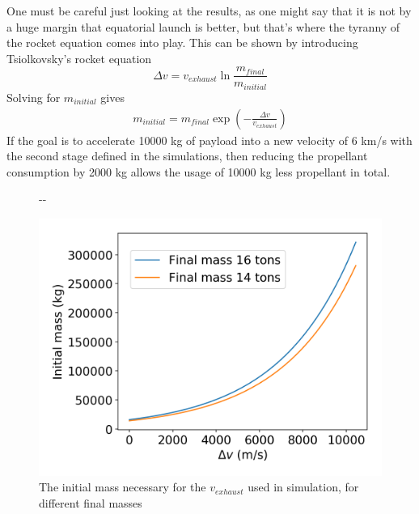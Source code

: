 \documentclass[11pt]{article}
\newlength{\offsetpage}
\newenvironment{widepage}{\begin{adjustwidth}{-\offsetpage}{-\offsetpage}%
    \addtolength{\textwidth}{2\offsetpage}}%
{\end{adjustwidth}}
\begin{document}
One must be careful just looking at the results, as one might say that it is not by a huge margin that equatorial launch is better, 
but that's where the tyranny of the rocket equation comes into play.
This can be shown by introducing Tsiolkovsky's rocket equation
$$
\Delta v = v_{exhaust} \ln \frac{m_{final}}{m_{initial}}
$$
Solving for $m_{initial}$ gives
$$
\begin{aligned}
  m_{initial} = m_{final} \exp \left( -\frac{\Delta v}{v_{exhaust}} \right)
\end{aligned}
$$
If the goal is to accelerate 10000 kg of payload into a new velocity of 6 km/s with the second stage defined in the simulations, 
then reducing the propellant consumption by 2000 kg allows the usage of 10000 kg less propellant in total.
\begin{figure}[H]
  \begin{widepage}
    \centering
    \begin{minipage}{0.45\textwidth}
      \centering
      \includegraphics[width=\textwidth]{./plots/consumedToInitial.png}
      \caption{The initial mass necessary for the $v_{exhaust}$ used in simulation, for different final masses}
    \end{minipage}
    \hspace{0.025\textwidth}
    \begin{minipage}{0.45\textwidth}
      \centering

\end{minipage}
\end{widepage}
\end{figure}
\end{document}
